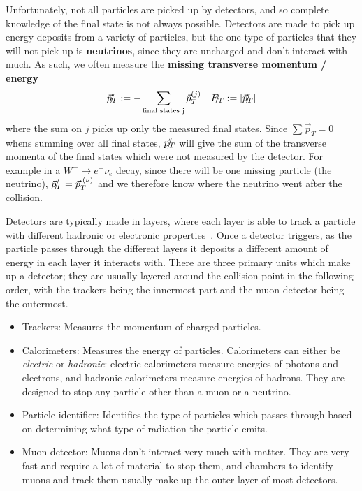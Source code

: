 \documentclass[11pt, oneside]{article}   	%
\theoremstyle{definition}
\numberwithin{equation}{subsection}		%
\begin{document}
Unfortunately, not all particles are picked up by detectors, and so complete knowledge of the final state is not always possible. Detectors are 
made to pick up energy deposits from a variety of particles, but the one type of particles that they will not pick up is \textbf{neutrinos}, since 
they are uncharged and don't interact with much. As such, we often measure the \textbf{missing transverse momentum / energy}
\begin{align}
	\slashed{\vec p_T} := - \sum_\textnormal{final states j} \vec p_T^{(j)} && \slashed{E_T} := |\slashed{\vec p_T}|
\end{align}
where the sum on $j$ picks up only the measured final states. Since $\sum \vec p_T = 0$ whens summing over all final states, $\slashed{\vec p_T}$ will give 
the sum of the transverse momenta of the final states which were not measured by the detector. For example in a $W^-\rightarrow e^-
\overline\nu_e$ decay, since there will be one missing particle (the neutrino), $\slashed{\vec p_T} = \vec p_T^{\;(\nu)}$ and we therefore know 
where the neutrino went after the collision. 

Detectors are typically made in layers, where each layer is able to track a particle with different hadronic or electronic 
properties~\cite{particle_detectors}. Once a detector triggers, as the particle passes through the different layers it deposits a different amount 
of energy in each layer it interacts with. There are three primary units which make up a detector; they are usually layered around the collision 
point in the following order, with the trackers being the innermost part and the muon detector being the outermost.
\begin{itemize}
	\item Trackers: Measures the momentum of charged particles.
	\item Calorimeters: Measures the energy of particles. Calorimeters can either be \textit{electric} or \textit{hadronic}: electric calorimeters 
	measure energies of photons and electrons, and hadronic calorimeters measure energies of hadrons. They are designed to stop any 
	particle other than a muon or a neutrino.
	\item Particle identifier: Identifies the type of particles which passes through based on determining what type of radiation the particle 
	emits.
	\item Muon detector: Muons don't interact very much with matter. They are very fast and require a lot of material to stop them, and 
	chambers to identify muons and track them usually make up the outer layer of most detectors. 
\end{itemize}
\end{document}
